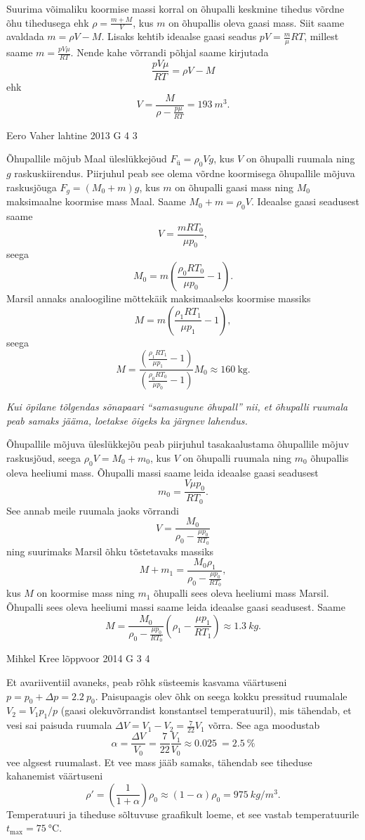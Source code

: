 \documentclass[11pt, twoside]{article}
\begin{document}
{{\ifSolution
Suurima võimaliku koormise massi korral on õhupalli keskmine tihedus võrdne õhu tihedusega ehk $\rho=\frac{m+M}{V}$, kus $m$ on õhupallis oleva gaasi mass. Siit saame avaldada $m=\rho V-M$. Lisaks kehtib ideaalse gaasi seadus $pV=\frac{m}{\mu}RT$, millest saame $m=\frac{pV\mu}{RT}$. Nende kahe võrrandi põhjal saame kirjutada
\[
\frac{pV\mu}{RT}=\rho V-M
\]
ehk
\[
V=\frac{M}{\rho-\frac{p\mu}{RT}}=\SI{193}{m^3}.
\]
\fi
}

{Eero Vaher} %
{lahtine} %
{2013} %
{G 4} %
{3} %
{

\ifSolution
Õhupallile mõjub Maal üleslükkejõud $F_{ü}=\rho_0Vg$, kus $V$ on õhupalli ruumala ning $g$ raskuskiirendus. Piirjuhul peab see olema võrdne koormisega õhupallile mõjuva raskusjõuga $F_g=(M_0+m)g$, kus $m$ on õhupalli gaasi mass ning $M_0$ maksimaalne koormise mass Maal. Saame $M_0+m=\rho_0V$. Ideaalse gaasi seadusest saame
\[
V=\frac{mRT_0}{\mu p_0},
\]
seega 
\[
M_0=m\left(\frac{\rho_0 RT_0}{\mu p_0}-1\right).
\]
Marsil annaks analoogiline mõttekäik maksimaalseks koormise massiks
\[
M=m(\frac{\rho_1RT_1}{\mu p_1}-1),
\]
seega
\[M=\frac{\left(\frac{\rho_1RT_1}{\mu p_1}-1\right)}{(\frac{\rho_0RT_0}{\mu p_0}-1)}M_0\approx \SI{160}{\kilogram}.
\]

{\em Kui õpilane tõlgendas sõnapaari ``samasugune õhupall'' nii, et õhupalli ruumala peab samaks jääma, loetakse õigeks ka järgnev lahendus.}

Õhupallile mõjuva üleslükkejõu peab piirjuhul tasakaalustama õhupallile mõjuv raskusjõud, seega $\rho_0 V=M_0+m_0$, kus $V$ on õhupalli ruumala ning $m_0$ õhupallis oleva heeliumi mass. Õhupalli massi saame leida ideaalse gaasi seadusest
\[
m_0=\frac{V\mu p_0}{RT_0}.
\]
See annab meile ruumala jaoks võrrandi
\[
V=\frac{M_0}{\rho_0-\frac{\mu p_0}{RT_0}}
\]
ning suurimaks Marsil õhku tõstetavaks massiks
\[
M+m_1=\frac{M_0\rho_1}{\rho_0-\frac{\mu p_0}{RT_0}},
\]
kus $M$ on koormise mass ning $m_1$ õhupalli sees oleva heeliumi mass Marsil. Õhupalli sees oleva heeliumi massi saame leida ideaalse gaasi seadusest. Saame
\[
M=\frac{M_0}{\rho_0-\frac{\mu p_0}{RT_0}}\left(\rho_1-\frac{\mu p_1}{RT_1}\right)\approx \SI{1,3}{kg}.
\]
\fi
}

{Mihkel Kree} %
{lõppvoor} %
{2014} %
{G 3} %
{4} %
{

\ifSolution
Et avariiventiil avaneks, peab rõhk süsteemis kasvama väärtuseni $p=p_0+\Delta p = \SI{2.2}{}p_0$. Paisupaagis olev õhk on seega kokku pressitud ruumalale $V_2=V_1 p_1/p$ (gaasi olekuvõrrandist konstantsel temperatuuril), mis tähendab, et vesi sai paisuda ruumala $\Delta V = V_1-V_2 = \frac{7}{22}V_1$ võrra. See aga moodustab \[\alpha = \frac{\Delta V}{V_0}= \frac{7}{22}\frac{V_1}{V_0}\approx \SI{0.025}{} = \SI{2.5}{}\%\] vee algsest ruumalast. Et vee mass jääb samaks, tähendab see tiheduse kahanemist väärtuseni \[\rho'=\left(\frac{1}{1+\alpha}\right)\rho_0\approx(1-\alpha)\rho_0= \SI{975}{kg/m^3}.\]
Temperatuuri ja tiheduse sõltuvuse graafikult loeme, et see vastab temperatuurile $t_\text{max}=\SI{75}{\celsius}$.
\fi
}

}
\end{document}
